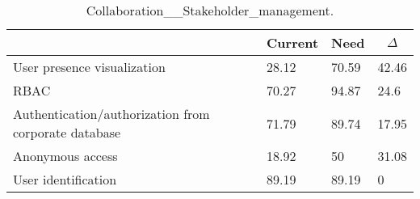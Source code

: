 
  \begin{table*}[]
  \centering
  \notsotiny
  \caption{ Collaboration__Stakeholder_management.}
\label{tab:collaboration__stakeholder_management}
\begin{tabular}{|l|l|l|l|}
  \hline
  \rowcolor[HTML]{C0C0C0}
    \multicolumn{1}{|c|}{Feature} & \multicolumn{1}{c|}{Current} & \multicolumn{1}{c|}{Need} & \multicolumn{1}{c|}{$\Delta$} \\ \hline
  User presence visualization & 28.12 & 70.59 & 42.46 \\ \hline 
RBAC & 70.27 & 94.87 & 24.6 \\ \hline 
Authentication/authorization from corporate database & 71.79 & 89.74 & 17.95 \\ \hline 
Anonymous access & 18.92 & 50 & 31.08 \\ \hline 
User identification & 89.19 & 89.19 & 0 \\ \hline 
\end{tabular}%
  \end{table*}